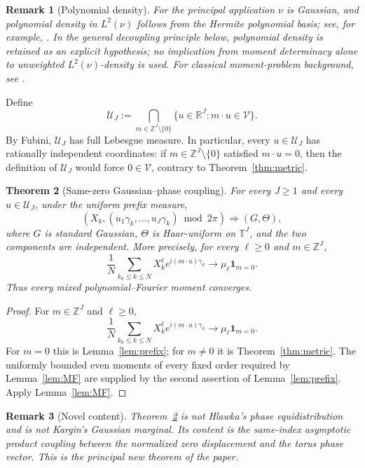 \documentclass[pdflatex,sn-mathphys-num]{sn-jnl}
\numberwithin{equation}{section}
\theoremstyle{thmstyleone}
\newtheorem{theorem}{Theorem}[section]
\theoremstyle{thmstylethree}
\theoremstyle{thmstyletwo}
\newtheorem{remark}[theorem]{Remark}
\newcommand{\R}{\mathbb R}
\newcommand{\Z}{\mathbb Z}
\newcommand{\Torus}{\mathbb T}
\newcommand{\1}{\mathbf 1}
\begin{document}
\begin{remark}[Polynomial density]
For the principal application \(\nu\) is Gaussian, and polynomial density
in \(L^2(\nu)\) follows from the Hermite polynomial basis; see, for example, \cite[Chs.~V, IX]{Szego1975}.  In the general
decoupling principle below, polynomial density is retained as an explicit
hypothesis; no implication from moment determinacy alone to unweighted
\(L^2(\nu)\)-density is used.  For classical moment-problem background, see
\cite{Bakan2001}.
\end{remark}


Define
\[
 \mathcal U_J:=
 \bigcap_{m\in\Z^J\setminus\{0\}}
 \{u\in\R^J:m\cdot u\in\mathcal V\}.
\]
By Fubini, $\mathcal U_J$ has full Lebesgue measure.  In particular,
every $u\in\mathcal U_J$ has rationally independent coordinates: if
$m\in\Z^J\setminus\{0\}$ satisfied $m\cdot u=0$, then the definition of
$\mathcal U_J$ would force $0\in\mathcal V$, contrary to
Theorem~\ref{thm:metric}.

\begin{theorem}[Same-zero Gaussian--phase coupling]
\label{thm:samezero}
For every $J\ge1$ and every $u\in\mathcal U_J$, under the uniform prefix measure,
\begin{equation}
 \left(
 X_k,
 (u_1\gamma_k,\ldots,u_J\gamma_k)\bmod2\pi
 \right)
 \Longrightarrow
 (G,\Theta),
\label{eq:samezero}
\end{equation}
where $G$ is standard Gaussian, $\Theta$ is Haar-uniform on $\Torus^J$, and the two components are independent.  More precisely, for every \(\ell\ge0\) and \(m\in\Z^J\),
\[
 \frac1N\sum_{k_0\le k\le N}
 X_k^\ell e^{i(m\cdot u)\gamma_k}
 \longrightarrow \mu_\ell\1_{m=0}.
\]
Thus every mixed polynomial--Fourier moment converges.
\end{theorem}

\begin{proof}
For $m\in\Z^J$ and $\ell\ge0$,
\[
 \frac1N\sum_{k_0\le k\le N}X_k^\ell e^{i(m\cdot u)\gamma_k}
 \longrightarrow \mu_\ell\1_{m=0}.
\]
For $m=0$ this is Lemma~\ref{lem:prefix}; for $m\ne0$ it is Theorem~\ref{thm:metric}.  The uniformly bounded even moments of every fixed order required by Lemma~\ref{lem:MF} are supplied by the second assertion of Lemma~\ref{lem:prefix}.  Apply Lemma~\ref{lem:MF}.
\end{proof}

\begin{remark}[Novel content]
Theorem~\ref{thm:samezero} is not Hlawka's phase equidistribution and is not Kargin's Gaussian marginal.  Its content is the same-index asymptotic product coupling between the normalized zero displacement and the torus phase vector.  This is the principal new theorem of the paper.
\end{remark}
\end{document}
